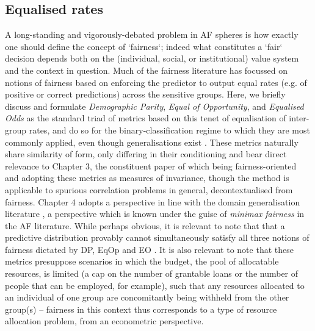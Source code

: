 \subsection{Equalised rates}\label{sec:equalised-rates}
%
A long-standing and vigorously-debated problem in AF spheres is how exactly one should define
the concept of `fairness`; indeed what constitutes a `fair` decision depends both on the
(individual, social, or institutional) value system and the context in question.
%
Much of the fairness literature has focussed on notions of fairness based on enforcing the
predictor to output equal rates (e.g. of positive or correct predictions) across the sensitive
groups.
%
Here, we briefly discuss and formulate \emph{Demographic Parity}, \emph{Equal of Opportunity}, and
\emph{Equalised Odds} as the standard triad of metrics based on this tenet of equalisation of
inter-group rates, and do so for the binary-classification regime to which they are most commonly
applied, even though generalisations exist \citep{woodworth2017learning}. 
%
These metrics naturally share similarity of form, only differing in their conditioning and bear
direct relevance to Chapter 3, the constituent paper of which being fairness-oriented and adopting
these metrics as measures of invariance, though the method is applicable to spurious correlation
problems in general, decontextualised from fairness.
%
Chapter 4 adopts a perspective in line with the domain generalisation literature
\cite{sagawa2019distributionally}, a perspective which is known under the guise of \emph{minimax
fairness} in the AF literature.
%
While perhaps obvious, it is relevant to note that that a predictive distribution provably cannot
simultaneously satisfy all three notions of fairness dictated by DP, EqOp and EO
\citep{kleinberg2016inherent}.
%
It is also relevant to note that these metrics presuppose scenarios in which the budget, the pool
of allocatable resources, is limited (a cap on the number of grantable loans or the number of
people that can be employed, for example), such that any resources allocated to an individual of
one group are concomitantly being withheld from the other group(s) -- fairness in this context thus
corresponds to a type of resource allocation problem, from an econometric perspective.
%

